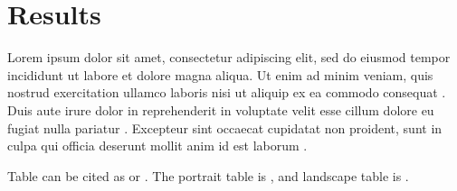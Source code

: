 \chapter{Results}
\label{chap:results}

Lorem ipsum dolor sit amet, consectetur adipiscing elit, sed do eiusmod tempor incididunt ut labore et dolore magna aliqua. Ut enim ad minim veniam, quis nostrud exercitation ullamco laboris nisi ut aliquip ex ea commodo consequat \cite{ref1}. Duis aute irure dolor in reprehenderit in voluptate velit esse cillum dolore eu fugiat nulla pariatur \cite{ref2}. Excepteur sint occaecat cupidatat non proident, sunt in culpa qui officia deserunt mollit anim id est laborum \cite{ref3}.

Table can be cited as  or .
The portrait table is , and landscape table is .


